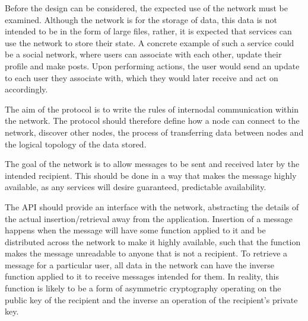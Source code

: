 Before the design can be considered, the expected use of the network must be examined. Although the network is for the storage of data, this data is not intended to be in the form of large files, rather, it is expected that services can use the network to store their state. A concrete example of such a service could be a social network, where users can associate with each other, update their profile and make posts. Upon performing actions, the user would send an update to each user they associate with, which they would later receive and act on accordingly.

The aim of the protocol is to write the rules of internodal communication within the network. The protocol should therefore define how a node can connect to the network, discover other nodes, the process of transferring data between nodes and the logical topology of the data stored.

The goal of the network is to allow messages to be sent and received later by the intended recipient. This should be done in a way that makes the message highly available, as any services will desire guaranteed, predictable availability.

The API should provide an interface with the network, abstracting the details of the actual insertion/retrieval away from the application. Insertion of a message happens when the message will have some function applied to it and be distributed across the network to make it highly available, such that the function makes the message unreadable to anyone that is not a recipient. To retrieve a message for a particular user, all data in the network can have the inverse function applied to it to receive messages intended for them. %
In reality, this function is likely to be a form of asymmetric cryptography operating on the public key of the recipient and the inverse an operation of the recipient's private key.